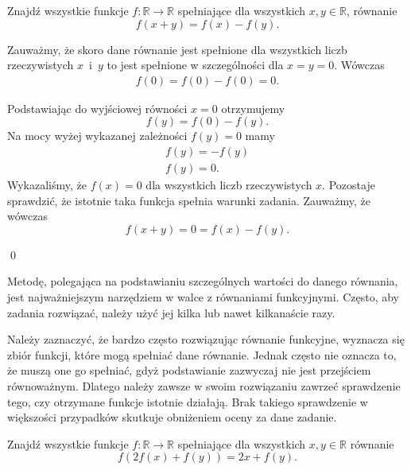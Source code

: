


\noindent
Znajdź wszystkie funkcje $f:\mathbb{R}\rightarrow\mathbb{R}$ spełniające dla wszystkich $x, y \in \mathbb{R}$, równanie 
\[
    f(x + y) = f(x) − f(y).
\]


\noindent
Zauważmy, że skoro dane równanie jest spełnione dla wszystkich liczb rzeczywistych $x$~i~$y$ to jest spełnione w szczególności dla $x = y = 0$. Wówczas
\begin{gather*}
    f(0) = f(0) - f(0) = 0.
\end{gather*}

\noindent
Podstawiając do wyjściowej równości $x = 0$ otrzymujemy
\[
    f(y) = f(0) - f(y).
\]
Na mocy wyżej wykazanej zależności $f(y) = 0$ mamy
\begin{gather*}
    f(y) = - f(y) \\
    f(y) = 0.
\end{gather*}
Wykazaliśmy, że $f(x) = 0$ dla wszystkich liczb rzeczywistych $x$. Pozostaje sprawdzić, że istotnie taka funkcja spełnia warunki zadania. Zauważmy, że wówczas
\[
    f(x + y) = 0 = f(x) - f(y).
\]

\qed

\vspace{10px}

\noindent
Metodę, polegająca na podstawianiu szczególnych wartości do danego równania, jest najważniejszym narzędziem w walce z równaniami funkcyjnymi. Często, aby zadania rozwiązać, należy użyć jej kilka lub nawet kilkanaście razy.

\vspace{10px}

\noindent
Należy zaznaczyć, że bardzo często rozwiązując równanie funkcyjne, wyznacza się zbiór funkcji, które mogą spełniać dane równanie. Jednak często nie oznacza to, że muszą one go spełniać, gdyż podstawianie zazwyczaj nie jest przejściem równoważnym. Dlatego należy zawsze w swoim rozwiązaniu zawrzeć sprawdzenie tego, czy otrzymane funkcje istotnie działają. Brak takiego sprawdzenie w większości przypadków skutkuje obniżeniem oceny za dane zadanie.

\vspace{20px}


\noindent
Znajdź wszystkie funkcje $f:\mathbb{R}\rightarrow\mathbb{R}$ spełniające dla wszystkich $x, y \in \mathbb{R}$ równanie 
\[
    f(2f(x) + f(y)) = 2x + f(y).
\]

